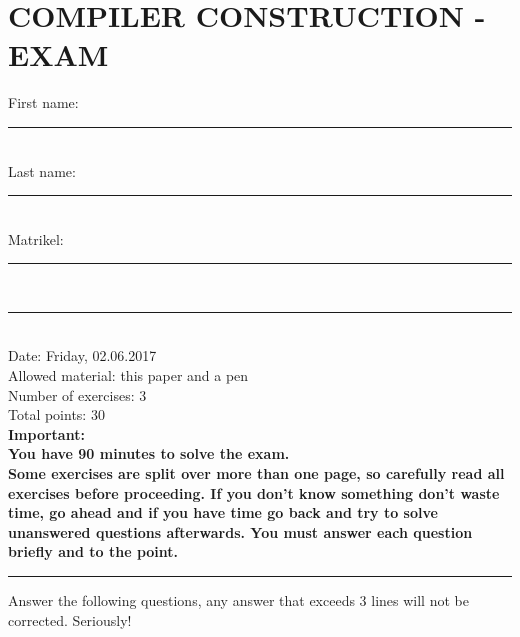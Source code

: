 \documentclass [11pt, a4wide, twoside]{article}
\begin{document}
\section*{COMPILER CONSTRUCTION - EXAM}


First name: \rule{100pt}{0.5pt}\\[1mm]
Last name: \rule{100pt}{0.5pt}\\[1mm]
Matrikel: \rule{100pt}{0.5pt}\\[1mm]
\rule{\textwidth}{1pt}\\[1mm]
Date: Friday, 02.06.2017\\
Allowed material: this paper and a pen\\
Number of exercises: 3\\
Total points: 30\\[1mm]
\noindent\textbf{Important:\\
You have 90 minutes to solve the exam.\\
Some exercises are split over more than one page, so carefully read all exercises before proceeding. 
If you don't know something don't waste time, go ahead and if you have time go back and try to solve unanswered questions afterwards.
You must answer each question briefly and to the point. 
}\\
\rule{\textwidth}{1pt}

% 
\newpage
{}
\noindent
%
Answer the following questions, any answer that exceeds 3 lines will not be corrected. Seriously!
\end{document}
